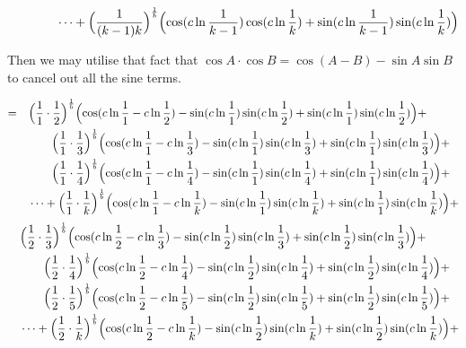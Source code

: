 \documentclass{amsart}
\begin{document}
	\[ \qquad\qquad \dots + \Bigl( \frac{1}{(k-1)k} \Bigr)^\frac1b \Bigl( \cos(c \ln \frac{1}{k-1}) \cos(c \ln \frac{1}{k}) + \sin(c \ln \frac{1}{k-1}) \sin(c \ln \frac{1}{k}) \Bigr) \]
	
	\[\]
	Then we may utilise that fact that $ \cos{A} \cdot \cos{B} = \cos{(A-B)} - \sin{A}\sin{B} $ to cancel out all the sine terms.
	
	\[
	\begin{aligned}
		= \quad & \Bigl( \frac{1}{1} \cdot \frac{1}{2} \Bigr)^\frac1b \Bigl( \cos(c \ln \frac{1}{1} - c \ln \frac{1}{2}) - \sin(c \ln \frac{1}{1}) \sin(c \ln \frac{1}{2}) + \sin(c \ln \frac{1}{1}) \sin(c \ln \frac{1}{2}) \Bigr) + \\
		& \qquad \Bigl( \frac{1}{1} \cdot \frac{1}{3} \Bigr)^\frac1b \Bigl( \cos(c \ln \frac{1}{1} - c \ln \frac{1}{3}) - \sin(c \ln \frac{1}{1}) \sin(c \ln \frac{1}{3}) + \sin(c \ln \frac{1}{1}) \sin(c \ln \frac{1}{3}) \Bigr) + \\
		& \qquad \Bigl( \frac{1}{1} \cdot \frac{1}{4} \Bigr)^\frac1b \Bigl( \cos(c \ln \frac{1}{1} - c \ln \frac{1}{4}) - \sin(c \ln \frac{1}{1}) \sin(c \ln \frac{1}{4}) + \sin(c \ln \frac{1}{1}) \sin(c \ln \frac{1}{4}) \Bigr) + \\
		& \dots  + \Bigl( \frac{1}{1} \cdot \frac{1}{k} \Bigr)^\frac1b \Bigl( \cos(c \ln \frac{1}{1} - c \ln \frac{1}{k}) - \sin(c \ln \frac{1}{1}) \sin(c \ln \frac{1}{k}) + \sin(c \ln \frac{1}{1}) \sin(c \ln \frac{1}{k}) \Bigr) + 
	\end{aligned}
	\]
	\[
	\begin{aligned}
		\quad & \Bigl( \frac{1}{2} \cdot \frac{1}{3} \Bigr)^\frac1b \Bigl( \cos(c \ln \frac{1}{2} - c \ln \frac{1}{3}) - \sin(c \ln \frac{1}{2}) \sin(c \ln \frac{1}{3}) + \sin(c \ln \frac{1}{2}) \sin(c \ln \frac{1}{3}) \Bigr) + \\
		& \qquad \Bigl( \frac{1}{2} \cdot \frac{1}{4} \Bigr)^\frac1b \Bigl( \cos(c \ln \frac{1}{2} - c \ln \frac{1}{4}) - \sin(c \ln \frac{1}{2}) \sin(c \ln \frac{1}{4}) + \sin(c \ln \frac{1}{2}) \sin(c \ln \frac{1}{4}) \Bigr) + \\
		& \qquad \Bigl( \frac{1}{2} \cdot \frac{1}{5} \Bigr)^\frac1b \Bigl( \cos(c \ln \frac{1}{2} - c \ln \frac{1}{5}) - \sin(c \ln \frac{1}{2}) \sin(c \ln \frac{1}{5}) + \sin(c \ln \frac{1}{2}) \sin(c \ln \frac{1}{5}) \Bigr) + \\
		& \dots  + \Bigl( \frac{1}{2} \cdot \frac{1}{k} \Bigr)^\frac1b \Bigl( \cos(c \ln \frac{1}{2} - c \ln \frac{1}{k}) - \sin(c \ln \frac{1}{2}) \sin(c \ln \frac{1}{k}) + \sin(c \ln \frac{1}{2}) \sin(c \ln \frac{1}{k}) \Bigr) + 
	\end{aligned}
	\]
\end{document}
